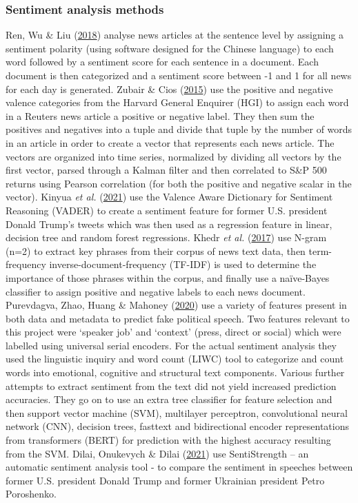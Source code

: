 \documentclass[11pt,preprint, authoryear]{elsarticle}
\numberwithin{equation}{section}
\numberwithin{figure}{section}
\numberwithin{table}{section}
\begin{document}
\hypertarget{sentiment-analysis-methods}{%
\subsubsection{\texorpdfstring{Sentiment analysis methods
\label{sentAnal}}{Sentiment analysis methods }}\label{sentiment-analysis-methods}}

Ren, Wu \& Liu (\protect\hyperlink{ref-ren2018forecasting}{2018})
analyse news articles at the sentence level by assigning a sentiment
polarity (using software designed for the Chinese language) to each word
followed by a sentiment score for each sentence in a document. Each
document is then categorized and a sentiment score between -1 and 1 for
all news for each day is generated. Zubair \& Cios
(\protect\hyperlink{ref-zubair2015extracting}{2015}) use the positive
and negative valence categories from the Harvard General Enquirer (HGI)
to assign each word in a Reuters news article a positive or negative
label. They then sum the positives and negatives into a tuple and divide
that tuple by the number of words in an article in order to create a
vector that represents each news article. The vectors are organized into
time series, normalized by dividing all vectors by the first vector,
parsed through a Kalman filter and then correlated to S\&P 500 returns
using Pearson correlation (for both the positive and negative scalar in
the vector). Kinyua \emph{et al.}
(\protect\hyperlink{ref-kinyua2021analysis}{2021}) use the Valence Aware
Dictionary for Sentiment Reasoning (VADER) to create a sentiment feature
for former U.S. president Donald Trump's tweets which was then used as a
regression feature in linear, decision tree and random forest
regressions. Khedr \emph{et al.}
(\protect\hyperlink{ref-khedr2017predicting}{2017}) use N-gram (n=2) to
extract key phrases from their corpus of news text data, then
term-frequency inverse-document-frequency (TF-IDF) is used to determine
the importance of those phrases within the corpus, and finally use a
naïve-Bayes classifier to assign positive and negative labels to each
news document. Purevdagva, Zhao, Huang \& Mahoney
(\protect\hyperlink{ref-purevdagva2020machine}{2020}) use a variety of
features present in both data and metadata to predict fake political
speech. Two features relevant to this project were `speaker job' and
`context' (press, direct or social) which were labelled using universal
serial encoders. For the actual sentiment analysis they used the
linguistic inquiry and word count (LIWC) tool to categorize and count
words into emotional, cognitive and structural text components. Various
further attempts to extract sentiment from the text did not yield
increased prediction accuracies. They go on to use an extra tree
classifier for feature selection and then support vector machine (SVM),
multilayer perceptron, convolutional neural network (CNN), decision
trees, fasttext and bidirectional encoder representations from
transformers (BERT) for prediction with the highest accuracy resulting
from the SVM. Dilai, Onukevych \& Dilai
(\protect\hyperlink{ref-dilaisentiment}{2021}) use SentiStrength -- an
automatic sentiment analysis tool - to compare the sentiment in speeches
between former U.S. president Donald Trump and former Ukrainian
president Petro Poroshenko.
\end{document}
